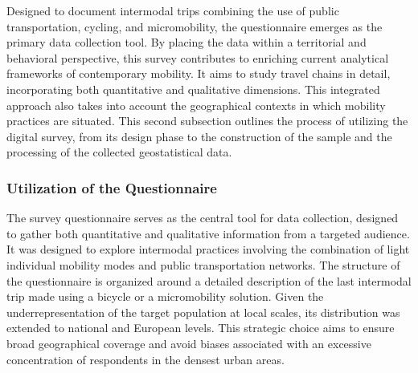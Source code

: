 \begin{refsegment}
Designed to document intermodal trips combining the use of public transportation, cycling, and micromobility, the questionnaire emerges as the primary data collection tool. By placing the data within a territorial and behavioral perspective, this survey contributes to enriching current analytical frameworks of contemporary mobility. It aims to study travel chains in detail, incorporating both quantitative and qualitative dimensions. This integrated approach also takes into account the geographical contexts in which mobility practices are situated. This second subsection outlines the process of utilizing the digital survey, from its design phase to the construction of the sample and the processing of the collected geostatistical data.%

\subsubsection*{Utilization of the Questionnaire
    \label{chap3:administration-questionnaire-usagers-exploitation}
    }

The survey questionnaire serves as the central tool for data collection, designed to gather both quantitative and qualitative information from a targeted audience. It was designed to explore intermodal practices involving the combination of light individual mobility modes and public transportation networks. The structure of the questionnaire is organized around a detailed description of the last intermodal trip made using a bicycle or a micromobility solution. Given the underrepresentation of the target population at local scales, its distribution was extended to national and European levels. This strategic choice aims to ensure broad geographical coverage and avoid biases associated with an excessive concentration of respondents in the densest urban areas.%


\end{refsegment}

